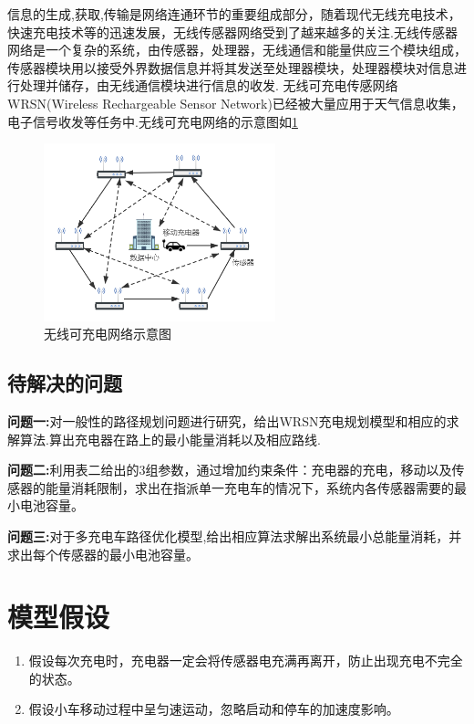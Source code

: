 \documentclass{whutmod}
\begin{document}
信息的生成,获取,传输是网络连通环节的重要组成部分，随着现代无线充电技术，快速充电技术等的迅速发展，无线传感器网络受到了越来越多的关注.无线传感器网络是一个复杂的系统，由传感器，处理器，无线通信和能量供应三个模块组成，传感器模块用以接受外界数据信息并将其发送至处理器模块，处理器模块对信息进行处理并储存，由无线通信模块进行信息的收发.
无线可充电传感网络WRSN(Wireless Rechargeable Sensor Network)已经被大量应用于天气信息收集，电子信号收发等任务中.无线可充电网络的示意图如\ref{示意图}
\begin{figure}[!htbp]
	\centering
	\includegraphics[width=0.6\textwidth]{system.png}
	\caption{无线可充电网络示意图}
	\label{示意图}
\end{figure} 




\subsection{待解决的问题}
\textbf{问题一:}对一般性的路径规划问题进行研究，给出WRSN充电规划模型和相应的求解算法.算出充电器在路上的最小能量消耗以及相应路线.

\textbf{问题二:}利用表二给出的3组参数，通过增加约束条件：充电器的充电，移动以及传感器的能量消耗限制，求出在指派单一充电车的情况下，系统内各传感器需要的最小电池容量。

\textbf{问题三:}对于多充电车路径优化模型,给出相应算法求解出系统最小总能量消耗，并求出每个传感器的最小电池容量。


\section{模型假设}
\begin{enumerate}
	\item 假设每次充电时，充电器一定会将传感器电充满再离开，防止出现充电不完全的状态。
	\item 假设小车移动过程中呈匀速运动，忽略启动和停车的加速度影响。
\end{enumerate}
\end{document}
